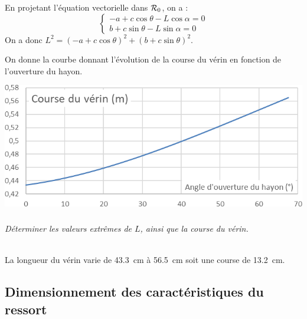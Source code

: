 \documentclass[10pt,fleqn]{article} %
\begin{document}
\begin{multicols}{2}
\begin{multicols}{2}
\begin{corrige}
En projetant l'équation vectorielle dans $\mathcal{R}_{0}$, on a : 
$$
\left\{ 
\begin{array}{l}
-a + c\cos\theta -L\cos\alpha ={0} \\
b + c\sin\theta -L\sin\alpha ={0}
\end{array}
\right.
$$
On a donc $L^2 =\left(-a + c\cos\theta \right)^2 + \left(b + c\sin\theta \right)^2  $.

\end{corrige}
\else
\fi

\ifprof
\else
On donne la courbe donnant l'évolution de la course du vérin en fonction de l'ouverture du hayon. 
\begin{center}
\includegraphics[width=.8\linewidth]{images/cor_02}
\end{center}
\fi

\vspace{-.6cm}

\subparagraph{}
\textit{Déterminer les valeurs extrêmes de $L$, ainsi que la course du vérin.}
\ifprof
\begin{corrige}~\\
La longueur du vérin varie de \SI{43,3}{cm} à \SI{56,5}{cm} soit une course de \SI{13,2}{cm}. 
\end{corrige}
\else
\fi
\ifprof
\else

%
%
%

\subsection*{Dimensionnement des caractéristiques du ressort}


\end{multicols}
\end{multicols}
\end{document}
